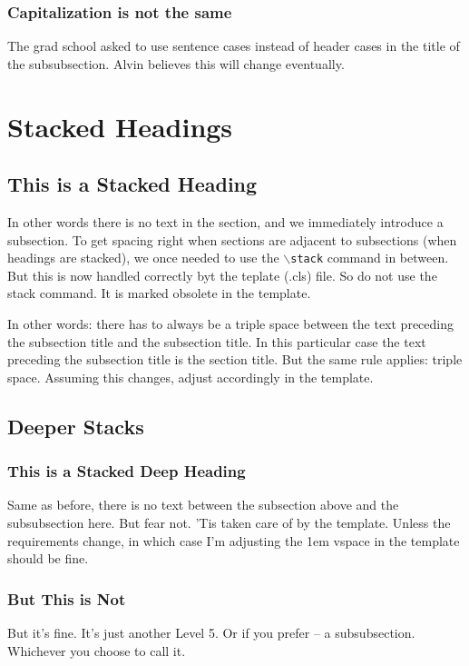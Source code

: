 \subsubsection{Capitalization is not the same}
The grad school asked to use sentence cases instead of header cases in the title of the subsubsection.
Alvin believes this will change eventually.

\section{Stacked Headings}

\stack %

\subsection{This is a Stacked Heading}
In other words there is no text in the section, and we immediately introduce a subsection.
To get spacing right when sections are adjacent to subsections (when headings are stacked),
we once needed to use the \texttt{$\backslash$stack} command in between.
But this is now handled correctly byt the teplate (.cls) file. So do not use the stack command.
It is marked obsolete in the template.

In other words: there has to always be a triple space between the text preceding the subsection title and the subsection title.
In this particular case the text preceding the subsection title is the section title.
But the same rule applies: triple space.
Assuming this changes, adjust accordingly in the template.

\subsection{Deeper Stacks}

\stack %

\subsubsection{This is a Stacked Deep Heading}
Same as before, there is no text between the subsection above and the subsubsection here.
But fear not. 'Tis taken care of by the template.
Unless the requirements change, in which case I'm adjusting the 1em vspace in the template should be fine.

\subsubsection{But This is Not}
But it's fine. It's just another Level 5. Or if you prefer -- a subsubsection. Whichever you choose to call it.
